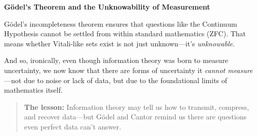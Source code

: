 \vspace{1em}
\textbf{Gödel’s Theorem and the Unknowability of Measurement}

Gödel’s incompleteness theorem ensures that questions like the Continuum Hypothesis cannot be settled from within standard mathematics (ZFC). That means whether Vitali-like sets exist is not just unknown—it’s \emph{unknowable}.

And so, ironically, even though information theory was born to measure uncertainty, we now know that there are forms of uncertainty it \emph{cannot measure}—not due to noise or lack of data, but due to the foundational limits of mathematics itself.

\begin{quote}
\textbf{The lesson:} Information theory may tell us how to transmit, compress, and recover data—but Gödel and Cantor remind us there are questions even perfect data can’t answer.
\end{quote}


